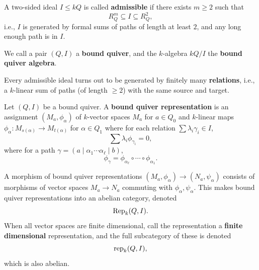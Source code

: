 \documentclass[12pt]{article}
\begin{document}
\begin{defn}
    A two-sided ideal $I\leq kQ$ is called \textbf{admissible} if there exists $m\geq 2$ such that
    \[R^m_Q \subseteq I \subseteq R^2_Q,\]
    i.e., $I$ is generated by formal sums of paths of length at least $2$, and any long enough path is in $I$.

    We call a pair $(Q,I)$ a \textbf{bound quiver}, and the $k$-algebra $kQ/I$ the \textbf{bound quiver algebra}.

    Every admissible ideal turns out to be generated by finitely many \textbf{relations}, i.e., a $k$-linear sum of paths (of length $\geq 2$) with the same source and target.
\end{defn}

\begin{defn}
    Let $(Q,I)$ be a bound quiver. A \textbf{bound quiver representation} is an assignment $(M_a,\phi_\alpha)$ of $k$-vector spaces $M_a$ for $a\in Q_0$ and $k$-linear maps $\phi_\alpha: M_{s(\alpha)} \to M_{t(\alpha)}$ for $\alpha\in Q_1$ where for each relation $\sum \lambda_i \gamma_i \in I$,
    \[\sum \lambda_i \phi_{\gamma_i} = 0,\]
    where for a path $\gamma = (a\mid \alpha_1\cdots \alpha_\ell \mid b)$,
    \[\phi_\gamma = \phi_{\alpha_\ell} \circ \cdots \circ \phi_{\alpha_1}.\]

    A morphism of bound quiver representations $(M_a,\phi_\alpha) \to (N_a,\psi_\alpha)$ consists of morphisms of vector spaces $M_a\to N_a$ commuting with $\phi_\alpha,\psi_\alpha$. This makes bound quiver representations into an abelian category, denoted
    \[\mathrm{Rep}_k(Q,I).\]
    When all vector spaces are finite dimensional, call the representation a \textbf{finite dimensional} representation, and the full subcategory of these is denoted
    \[\mathrm{rep}_k(Q,I),\]
    which is also abelian.
\end{defn}
\end{document}

